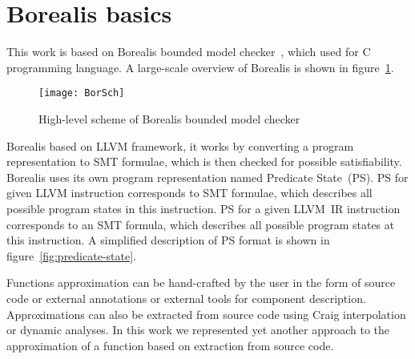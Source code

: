 \section{Borealis basics}\label{sec:basics}

This work is based on Borealis bounded model checker~\cite{Borealis}, which used for C programming language. A large-scale overview of Borealis is shown in figure~\ref{fig:borealis-scheme}.

\begin{figure}[tbh]
\centering
\caption{High-level scheme of Borealis bounded model checker}
\label{fig:borealis-scheme}
\texttt{[image: BorSch]}
\end{figure}

Borealis based on LLVM \cite{LLVM} framework, it works by converting a program representation to SMT formulae, which is then checked for possible satisfiability. Borealis uses its own program representation named Predicate State~(PS). PS for given LLVM instruction corresponds to SMT formulae, which describes all possible program states in this instruction. PS for a given LLVM~IR instruction corresponds to an SMT formula, which describes all possible program states at this instruction. A simplified description of PS format is shown in figure~\ref{fig:predicate-state}.



Functions approximation can be hand-crafted by the user in the form of source code or external annotations or external tools for component description. Approximations can also be extracted from source code using Craig interpolation or dynamic analyses. In this work we represented yet another approach to the approximation of a function based on extraction from source code.
